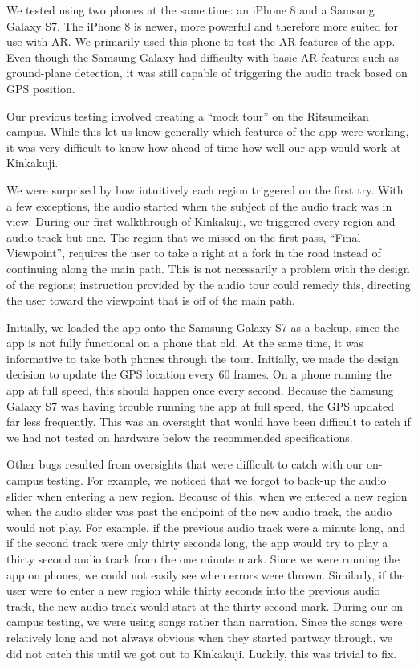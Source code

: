 \documentclass[a4paper, 10pt, american, titlepage]{article}
\begin{document}
We tested using two phones at the same time: an iPhone 8 and a Samsung Galaxy
S7. The iPhone 8 is newer, more powerful and therefore more suited for use with
AR. We primarily used this phone to test the AR features of the app. Even
though the Samsung Galaxy had difficulty with basic AR features such as
ground-plane detection, it was still capable of triggering the audio track
based on GPS position.

Our previous testing involved creating a ``mock tour'' on the Ritsumeikan campus.
While this let us know generally which features of the app were working, it was
very difficult to know how ahead of time how well our app would work at Kinkakuji.

We were surprised by how intuitively each region triggered on the first try.
With a few exceptions, the audio started when the subject of the audio track
was in view. During our first walkthrough of Kinkakuji, we triggered every
region and audio track but one. The region that we missed on the first pass,
``Final Viewpoint'', requires the user to take a right at a fork in the road
instead of continuing along the main path. This is not necessarily a problem
with the design of the regions; instruction provided by the audio tour could
remedy this, directing the user toward the viewpoint that is off of the main
path.

Initially, we loaded the app onto the Samsung Galaxy S7 as a backup, since the
app is not fully functional on a phone that old. At the same time, it was
informative to take both phones through the tour. Initially, we made the design
decision to update the GPS location every 60 frames. On a phone running the app
at full speed, this should happen once every second. Because the Samsung Galaxy
S7 was having trouble running the app at full speed, the GPS updated far less
frequently. This was an oversight that would have been difficult to catch if we
had not tested on hardware below the recommended specifications.

Other bugs resulted from oversights that were difficult to catch with our
on-campus testing.  For example, we noticed that we forgot to back-up the audio
slider when entering a new region.  Because of this, when we entered a new
region when the audio slider was past the endpoint of the new audio track, the
audio would not play. For example, if the previous audio track were a minute
long, and if the second track were only thirty seconds long, the app would try
to play a thirty second audio track from the one minute mark. Since we were
running the app on phones, we could not easily see when errors were thrown.
Similarly, if the user were to enter a new region while thirty seconds into the
previous audio track, the new audio track would start at the thirty second
mark. During our on-campus testing, we were using songs rather than narration.
Since the songs were relatively long and not always obvious when they started
partway through, we did not catch this until we got out to Kinkakuji.  Luckily,
this was trivial to fix.
\end{document}
